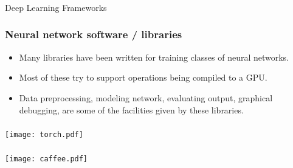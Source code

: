 \begin{frame}[fragile]\frametitle{}
\begin{center}
{\Large Deep Learning Frameworks}
\end{center}
\end{frame}





\begin{frame}[fragile] \frametitle{Neural network software / libraries}
\begin{itemize}
\item Many libraries have been written for training
classes of neural networks. 
\item Most of these try to support operations being compiled to a GPU.
\item Data preprocessing, modeling network, evaluating output, graphical debugging, are some of the facilities given by these libraries.
\end{itemize}
\end{frame}

\begin{frame}[fragile] \frametitle{}

\texttt{[image: torch.pdf]}

\end{frame}

\begin{frame}[fragile] \frametitle{}

\texttt{[image: caffee.pdf]}

\end{frame}

